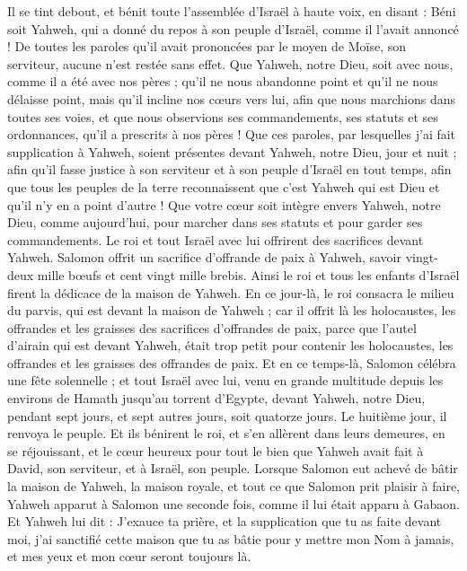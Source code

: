 \begin{multicols}{2}
Il se tint debout, et bénit toute l'assemblée d'Israël à haute voix, en disant :
Béni soit Yahweh, qui a donné du repos à son peuple d'Israël, comme il l’avait annoncé ! De toutes les paroles qu'il avait prononcées par le moyen de Moïse, son serviteur, aucune n’est restée sans effet.
Que Yahweh, notre Dieu, soit avec nous, comme il a été avec nos pères ; qu'il ne nous abandonne point et qu'il ne nous délaisse point,
mais qu'il incline nos cœurs vers lui, afin que nous marchions dans toutes ses voies, et que nous observions ses commandements, ses statuts et ses ordonnances, qu'il a prescrits à nos pères !
Que ces paroles, par lesquelles j'ai fait supplication à Yahweh, soient présentes devant Yahweh, notre Dieu, jour et nuit ; afin qu'il fasse justice à son serviteur et à son peuple d’Israël en tout temps,
afin que tous les peuples de la terre reconnaissent que c'est Yahweh qui est Dieu et qu'il n'y en a point d'autre !
Que votre cœur soit intègre envers Yahweh, notre Dieu, comme aujourd'hui, pour marcher dans ses statuts et pour garder ses commandements.
Le roi et tout Israël avec lui offrirent des sacrifices devant Yahweh.
Salomon offrit un sacrifice d'offrande de paix à Yahweh, savoir vingt-deux mille bœufs et cent vingt mille brebis. Ainsi le roi et tous les enfants d'Israël firent la dédicace de la maison de Yahweh.
En ce jour-là, le roi consacra le milieu du parvis, qui est devant la maison de Yahweh ; car il offrit là les holocaustes, les offrandes et les graisses des sacrifices d’offrandes de paix, parce que l'autel d'airain qui est devant Yahweh, était trop petit pour contenir les holocaustes, les offrandes et les graisses des offrandes de paix.
Et en ce temps-là, Salomon célébra une fête solennelle ; et tout Israël avec lui, venu en grande multitude depuis les environs de Hamath jusqu'au torrent d'Egypte, devant Yahweh, notre Dieu, pendant sept jours, et sept autres jours, soit quatorze jours.
Le huitième jour, il renvoya le peuple. Et ils bénirent le roi, et s'en allèrent dans leurs demeures, en se réjouissant, et le cœur heureux pour tout le bien que Yahweh avait fait à David, son serviteur, et à Israël, son peuple.
\VerseOne{}Lorsque Salomon eut achevé de bâtir la maison de Yahweh, la maison royale, et tout ce que Salomon prit plaisir à faire,
Yahweh apparut à Salomon une seconde fois, comme il lui était apparu à Gabaon.
Et Yahweh lui dit : J'exauce ta prière, et la supplication que tu as faite devant moi, j'ai sanctifié cette maison que tu as bâtie pour y mettre mon Nom à jamais, et mes yeux et mon cœur seront toujours là.

\end{multicols}
